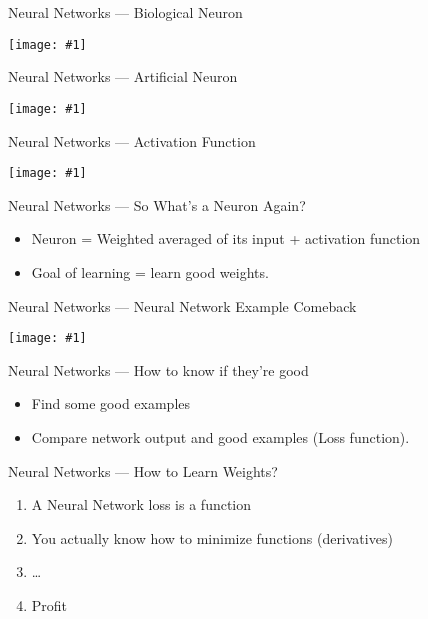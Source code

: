 \documentclass{beamer}
\newcommand\cimgg[1]{\vfill\centerline{\texttt{[image: \#1]}}\vfill}
\begin{document}
\begin{frame}{Neural Networks --- Biological Neuron}
  \cimgg{neuron.png}
\end{frame}

\begin{frame}{Neural Networks --- Artificial Neuron}
  \cimgg{neuron-model.png}
\end{frame}

\begin{frame}{Neural Networks --- Activation Function}
  \cimgg{activation.jpeg}
\end{frame}

\begin{frame}{Neural Networks --- So What's a Neuron Again?}
  \begin{itemize}
  \item   Neuron = Weighted averaged of its input + activation function
  \item   Goal of learning = learn good weights.
  \end{itemize}
\end{frame}

\begin{frame}{Neural Networks --- Neural Network Example Comeback}
  \cimgg{neural-network.png}
\end{frame}

\begin{frame}{Neural Networks --- How to know if they're good}
  \begin{itemize}
  \item Find some good examples
  \item Compare network output and good examples (Loss function).
  \end{itemize}
\end{frame}

\begin{frame}{Neural Networks --- How to Learn Weights?}
  \begin{enumerate}
  \item A Neural Network loss is a function
  \item You actually know how to minimize functions (derivatives)
  \item …
  \item Profit
  \end{enumerate}
\end{frame}
\end{document}
